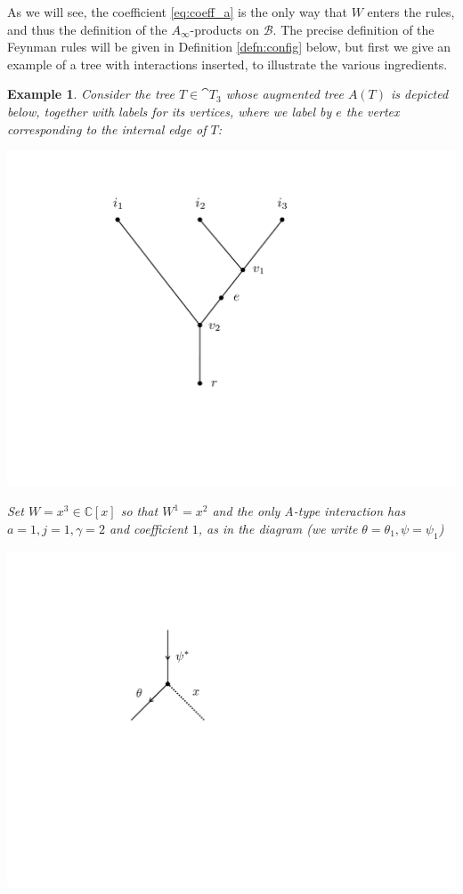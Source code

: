 \documentclass[english,letter paper,12pt,leqno]{article}
\theoremstyle{example}
\newtheorem{example}[theorem]{Example}
\numberwithin{equation}{section}
\begin{document}
As we will see, the coefficient \eqref{eq:coeff_a} is the only way that $W$ enters the rules, and thus the definition of the $A_\infty$-products on $\mathscr{B}$. The precise definition of the Feynman rules will be given in Definition \ref{defn:config} below, but first we give an example of a tree with interactions inserted, to illustrate the various ingredients.

\begin{example} Consider the tree $T \in \cat{T}_3$ whose augmented tree $A(T)$ is depicted below, together with labels for its vertices, where we label by $e$ the vertex corresponding to the internal edge of $T$:
\begin{center}
\includegraphics[scale=0.25]{dia7}
\end{center}
Set $W = x^3 \in \mathbb{C}[x]$ so that $W^1 = x^2$ and the only A-type interaction has $a = 1, j = 1, \gamma = 2$ and coefficient $1$, as in the diagram (we write $\theta = \theta_1, \psi = \psi_1$)
\begin{center}
\includegraphics[scale=0.3]{dia5}

\end{center}
\end{example}
\end{document}
